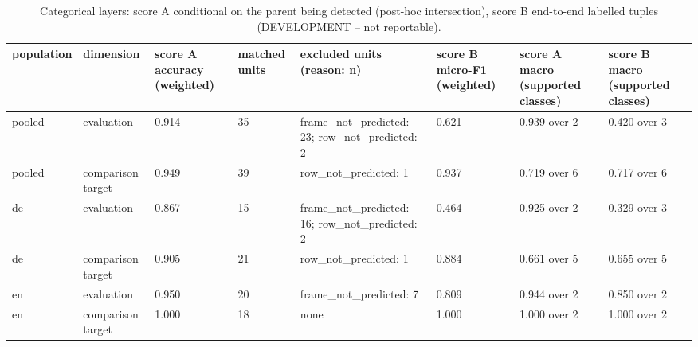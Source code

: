 \begin{table}[htbp]
\centering
\small
\begin{tabular}{llllllll}
\toprule
\textbf{population} & \textbf{dimension} & \textbf{score A accuracy (weighted)} & \textbf{matched units} & \textbf{excluded units (reason: n)} & \textbf{score B micro-F1 (weighted)} & \textbf{score A macro (supported classes)} & \textbf{score B macro (supported classes)} \\
\midrule
pooled & evaluation & 0.914 & 35 & frame\_not\_predicted: 23; row\_not\_predicted: 2 & 0.621 & 0.939 over 2 & 0.420 over 3 \\
pooled & comparison target & 0.949 & 39 & row\_not\_predicted: 1 & 0.937 & 0.719 over 6 & 0.717 over 6 \\
de & evaluation & 0.867 & 15 & frame\_not\_predicted: 16; row\_not\_predicted: 2 & 0.464 & 0.925 over 2 & 0.329 over 3 \\
de & comparison target & 0.905 & 21 & row\_not\_predicted: 1 & 0.884 & 0.661 over 5 & 0.655 over 5 \\
en & evaluation & 0.950 & 20 & frame\_not\_predicted: 7 & 0.809 & 0.944 over 2 & 0.850 over 2 \\
en & comparison target & 1.000 & 18 & none & 1.000 & 1.000 over 2 & 1.000 over 2 \\
\bottomrule
\end{tabular}
\caption{Categorical layers: score A conditional on the parent being detected (post-hoc intersection), score B end-to-end labelled tuples (DEVELOPMENT -- not reportable).}
\end{table}
